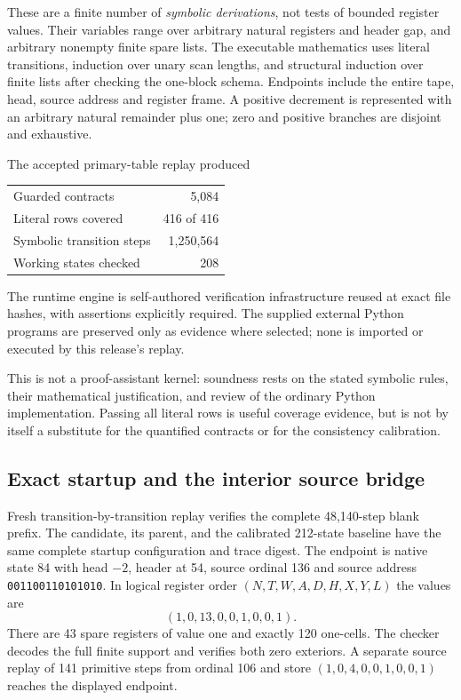 \documentclass[11pt,letterpaper]{article}
\begin{document}
These are a finite number of \emph{symbolic derivations}, not tests of
bounded register values. Their variables range over arbitrary natural
registers and header gap, and arbitrary nonempty finite spare lists.
The executable mathematics uses literal transitions, induction over
unary scan lengths, and structural induction over finite lists after
checking the one-block schema. Endpoints include the entire tape,
head, source address and register frame. A positive decrement is
represented with an arbitrary natural remainder plus one; zero and
positive branches are disjoint and exhaustive.

The accepted primary-table replay produced
\begin{center}
\begin{tabular}{lr}\toprule
Guarded contracts & 5,084\\
Literal rows covered & 416 of 416\\
Symbolic transition steps & 1,250,564\\
Working states checked & 208\\\bottomrule
\end{tabular}
\end{center}
The runtime engine is self-authored verification infrastructure reused
at exact file hashes, with assertions explicitly required. The supplied
external Python programs are preserved only as evidence where selected;
none is imported or executed by this release's replay.

This is not a proof-assistant kernel: soundness rests on the stated
symbolic rules, their mathematical justification, and review of the
ordinary Python implementation. Passing all literal rows is useful
coverage evidence, but is not by itself a substitute for the quantified
contracts or for the consistency calibration.

\subsection{Exact startup and the interior source bridge}
Fresh transition-by-transition replay verifies the complete 48,140-step
blank prefix. The candidate, its parent, and the calibrated 212-state
baseline have the same complete startup configuration and trace digest.
The endpoint is native state 84 with head $-2$, header at 54, source
ordinal 136 and source address \texttt{001100110101010}.
In logical register order $(N,T,W,A,D,H,X,Y,L)$ the values are
\[
 (1,0,13,0,0,1,0,0,1).
\]
There are 43 spare registers of value one and exactly 120 one-cells.
The checker decodes the full finite support and verifies both zero
exteriors. A separate source replay of 141 primitive steps from ordinal
106 and store $(1,0,4,0,0,1,0,0,1)$ reaches the displayed endpoint.
\end{document}
